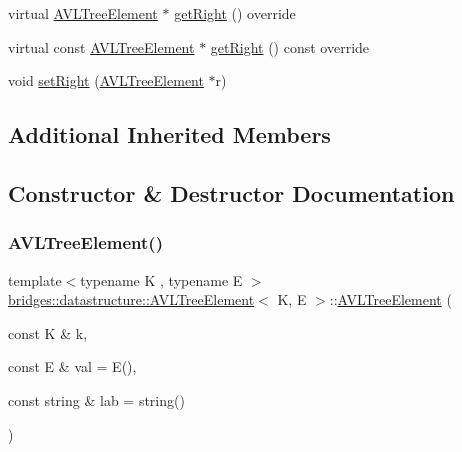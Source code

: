 \begin{DoxyCompactItemize}
\item 
virtual \mbox{\hyperlink{classbridges_1_1datastructure_1_1_a_v_l_tree_element}{A\+V\+L\+Tree\+Element}} $\ast$ \mbox{\hyperlink{classbridges_1_1datastructure_1_1_a_v_l_tree_element_aed585fdf56fcbfebac6cd0262c9c1807}{get\+Right}} () override
\item 
virtual const \mbox{\hyperlink{classbridges_1_1datastructure_1_1_a_v_l_tree_element}{A\+V\+L\+Tree\+Element}} $\ast$ \mbox{\hyperlink{classbridges_1_1datastructure_1_1_a_v_l_tree_element_a5a2c4b96b51da1daa3c0426882250acb}{get\+Right}} () const override
\item 
void \mbox{\hyperlink{classbridges_1_1datastructure_1_1_a_v_l_tree_element_a8ef25fb87bcce418541adccb17cbee80}{set\+Right}} (\mbox{\hyperlink{classbridges_1_1datastructure_1_1_a_v_l_tree_element}{A\+V\+L\+Tree\+Element}} $\ast$r)
\end{DoxyCompactItemize}
\subsection*{Additional Inherited Members}


\subsection{Constructor \& Destructor Documentation}
\mbox{\label{classbridges_1_1datastructure_1_1_a_v_l_tree_element_a611fc818eeb478e330ef585adcefd9e6}} 
\subsubsection{\texorpdfstring{AVLTreeElement()}{AVLTreeElement()}}
{\footnotesize\ttfamily template$<$typename K , typename E $>$ \\
\mbox{\hyperlink{classbridges_1_1datastructure_1_1_a_v_l_tree_element}{bridges\+::datastructure\+::\+A\+V\+L\+Tree\+Element}}$<$ K, E $>$\+::\mbox{\hyperlink{classbridges_1_1datastructure_1_1_a_v_l_tree_element}{A\+V\+L\+Tree\+Element}} (\begin{DoxyParamCaption}\item[{const K \&}]{k,  }\item[{const E \&}]{val = {\ttfamily E()},  }\item[{const string \&}]{lab = {\ttfamily string()} }\end{DoxyParamCaption})\hspace{0.3cm}{\ttfamily [inline]}}

